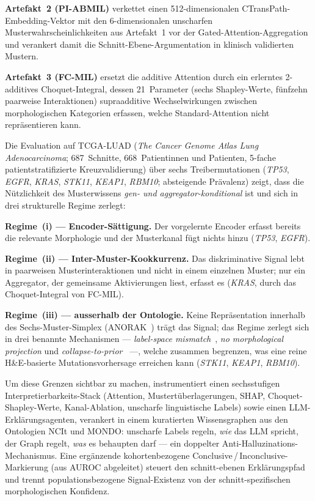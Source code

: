 \textbf{Artefakt~2 (PI-ABMIL)} verkettet einen 512-dimensionalen
CTransPath-Embedding-Vektor mit den 6-dimensionalen unscharfen
Musterwahrscheinlichkeiten aus Artefakt~1 vor der
Gated-Attention-Aggregation und verankert damit die
Schnitt-Ebene-Argumentation in klinisch validierten Mustern.

\textbf{Artefakt~3 (FC-MIL)} ersetzt die additive Attention durch
ein erlerntes 2-additives Choquet-Integral, dessen 21~Parameter
(sechs Shapley-Werte, fünfzehn paarweise Interaktionen)
supraadditive Wechselwirkungen zwischen morphologischen Kategorien
erfassen, welche Standard-Attention nicht repräsentieren kann.

Die Evaluation auf TCGA-LUAD (\emph{The Cancer Genome Atlas
Lung Adenocarcinoma}; 687~Schnitte, 668~Patientinnen und Patienten,
5-fache patientstratifizierte Kreuzvalidierung) über sechs
Treibermutationen (\textit{TP53}, \textit{EGFR}, \textit{KRAS},
\textit{STK11}, \textit{KEAP1}, \textit{RBM10}; absteigende
Prävalenz) zeigt, dass die Nützlichkeit des Musterwissens
\emph{gen- und aggregator-konditional} ist und sich in drei
strukturelle Regime zerlegt:

\textbf{Regime~(i) --- Encoder-Sättigung.}
Der vorgelernte Encoder erfasst bereits die relevante Morphologie
und der Musterkanal fügt nichts hinzu (\textit{TP53}, \textit{EGFR}).

\textbf{Regime~(ii) --- Inter-Muster-Kookkurrenz.}
Das diskriminative Signal lebt in paarweisen Musterinteraktionen
und nicht in einem einzelnen Muster; nur ein Aggregator, der
gemeinsame Aktivierungen liest, erfasst es (\textit{KRAS}, durch
das Choquet-Integral von FC-MIL).

\textbf{Regime~(iii) --- ausserhalb der Ontologie.}
Keine Repräsentation innerhalb des Sechs-Muster-Simplex
(ANORAK~\cite{anorak2024}) trägt das Signal; das Regime zerlegt
sich in drei benannte Mechanismen --- \emph{label-space
mismatch}~\cite{lipton2018labelshift}, \emph{no morphological
projection} und
\emph{collapse-to-prior}~\cite{bowman2016posteriorcollapse} ---,
welche zusammen begrenzen, was eine reine H\&E-basierte
Mutationsvorhersage erreichen kann (\textit{STK11}, \textit{KEAP1},
\textit{RBM10}).

Um diese Grenzen sichtbar zu machen, instrumentiert \lchai{} einen
sechsstufigen Interpretierbarkeits-Stack (Attention,
Mustertüberlagerungen, SHAP, Choquet-Shapley-Werte, Kanal-Ablation,
unscharfe linguistische Labels) sowie einen LLM-Erklärungsagenten,
verankert in einem kuratierten Wissensgraphen aus den Ontologien
NCIt und MONDO: unscharfe Labels regeln, \emph{wie} das LLM spricht,
der Graph regelt, \emph{was} es behaupten darf --- ein doppelter
Anti-Halluzinations-Mechanismus.
Eine ergänzende kohortenbezogene Conclusive\,/\,Inconclusive-Markierung
(aus AUROC abgeleitet) steuert den schnitt-ebenen Erklärungspfad
und trennt populationsbezogene Signal-Existenz von der
schnitt-spezifischen morphologischen Konfidenz.


